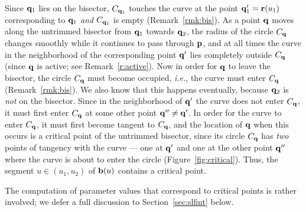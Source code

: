 Since ${\bf q}_1$ lies on the bisector, $C_{{\bf q}_1}$ touches
the curve at the point ${\bf q}'_1={\bf r}(u_{1})$ corresponding to
${\bf q}_1$ {\it and} $C_{{\bf q}_1}$ is empty (Remark~\ref{rmk:bis}).
As a point ${\bf q}$ moves along the untrimmed bisector from ${\bf q}
_1$ towards ${\bf q}_2$, the radius of the circle $C_{\bf q}$ changes
smoothly while it continues to pass through ${\bf p}$, and at all times
the curve in the neighborhood of the corresponding point ${\bf q}'$
lies completely outside $C_{\bf q}$ (since ${\bf q}$ is active; see
Remark~\ref{r:active}). Now in order for ${\bf q}$ to leave the
bisector, the circle $C_{\bf q}$ must become occupied, {\it i.e.},
the curve must enter $C_{\bf q}$ (Remark~\ref{rmk:bis}). We also know
that this happens eventually, because ${\bf q}_2$ is {\it not\/} on
the bisector. Since in the neighborhood of ${\bf q}'$ the curve does
not enter $C_{\bf q}$,
%
%
it must first enter $C_{\bf q}$ at some other point ${\bf q}'' \neq
{\bf q}'$. In order for the curve to enter $C_{\bf q}$, it must first
become tangent to $C_{\bf q}$, and the location of ${\bf q}$ when
this occurs is a critical point of the untrimmed bisector, since its
circle $C_{\bf q}$ has {\it two\/} points of tangency with the curve
--- one at ${\bf q}'$ and one at the other point ${\bf q}''$ where the
curve is about to enter the circle (Figure~\ref{fig:critical}). Thus,
the segment $u \in (u_1,u_2)$ of ${\bf b}(u)$ contains a critical point.
\QED

The computation of parameter values that correspond to critical points is
rather involved; we defer a full discussion to Section~\ref{sec:slfint}
below.

